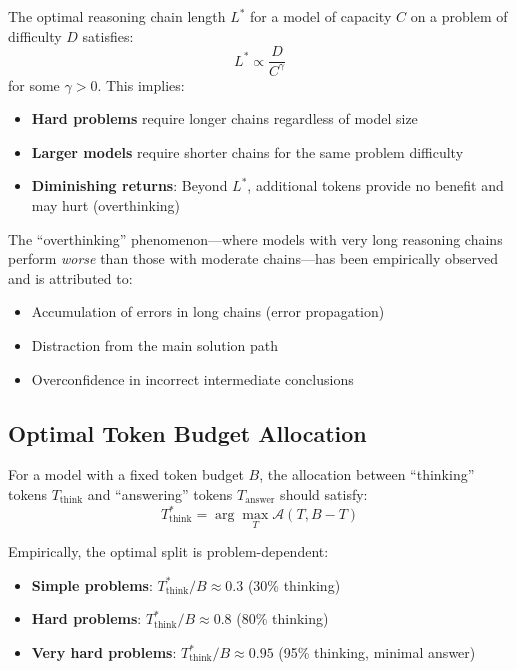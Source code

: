 \begin{keybox}
The optimal reasoning chain length $L^*$ for a model of capacity $C$ on a problem of difficulty $D$ satisfies: 
\begin{equation}
    L^* \propto \frac{D}{C^{\gamma}}
\end{equation}
 for some $\gamma > 0$. This implies:

\begin{itemize}
  \item \textbf{Hard problems} require longer chains regardless of model size
  \item \textbf{Larger models} require shorter chains for the same problem difficulty
  \item \textbf{Diminishing returns}: Beyond $L^*$, additional tokens provide no benefit and may hurt (overthinking)
\end{itemize}
\end{keybox}

The ``overthinking'' phenomenon---where models with very long reasoning chains perform \emph{worse} than those with moderate chains---has been empirically observed and is attributed to:

\begin{itemize}
  \item Accumulation of errors in long chains (error propagation)
  \item Distraction from the main solution path
  \item Overconfidence in incorrect intermediate conclusions
\end{itemize}

\subsection{Optimal Token Budget Allocation}
\label{optimal-token-budget-allocation}

For a model with a fixed token budget $B$, the allocation between ``thinking'' tokens $T_{\text{think}}$ and ``answering'' tokens $T_{\text{answer}}$ should satisfy: 
\begin{equation}
    T_{\text{think}}^* = \arg\max_{T} \mathcal{A}(T, B - T)
\end{equation}

Empirically, the optimal split is problem-dependent:

\begin{itemize}
  \item \textbf{Simple problems}: $T_{\text{think}}^* / B \approx 0.3$ (30\% thinking)
  \item \textbf{Hard problems}: $T_{\text{think}}^* / B \approx 0.8$ (80\% thinking)
  \item \textbf{Very hard problems}: $T_{\text{think}}^* / B \approx 0.95$ (95\% thinking, minimal answer)
\end{itemize}

